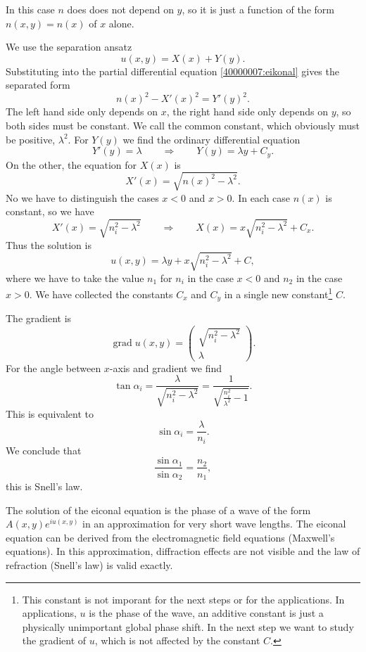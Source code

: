 \begin{loesung}
In this case $n$ does does not depend on $y$, so it is just a function
of the form $n(x,y)=n(x)$ of $x$ alone.
\begin{teilaufgaben}
\item
We use the separation ansatz
\[
u(x,y)=X(x) + Y(y).
\]
Substituting into the partial differential equation
\eqref{40000007:eikonal} gives the separated form
\[
n(x)^2-X'(x)^2=Y'(y)^2.
\]
The left hand side only depends on $x$, the right hand side only depends
on $y$, so both sides must be constant.
We call the common constant, which obviously must be positive, 
$\lambda^2$.
For 
$Y(y)$
we find the ordinary differential equation
\[
Y'(y)=\lambda \qquad\Rightarrow\qquad Y(y)=\lambda y+ C_y.
\]
On the other, the equation for $X(x)$ is
\[
X'(x)=\sqrt{n(x)^2-\lambda^2}.
\]
No we have to distinguish the cases $x<0$ and $x>0$.
In each case $n(x)$ is constant, so we have
\[
X'(x)=\sqrt{n_i^2-\lambda^2}
\qquad
\Rightarrow
\qquad
X(x)=x\sqrt{n_i^2-\lambda^2} + C_x.
\]
Thus the solution is
\[
u(x,y)=\lambda y + x\sqrt{n_i^2-\lambda^2} + C,
\]
where we have to take the value $n_1$ for $n_i$ in the case $x<0$
and $n_2$ in the case $x>0$.
We have collected the constants
$C_x$ and $C_y$ in a single new constant\footnote{This constant
is not imporant for the next steps or for the applications.
In applications, $u$ is the phase of the wave, an additive constant
is just a physically unimportant global phase shift.
In the next step we want to study the gradient of $u$, which is not
affected by the constant $C$.}
$C$.
\item
The gradient is
\[
\operatorname{grad}u(x,y)
=
\begin{pmatrix}
\sqrt{n_i^2-\lambda^2}\\
\lambda
\end{pmatrix}.
\]
For the angle between $x$-axis and gradient we find
\[
\tan\alpha_i
=
\frac{\lambda}{\sqrt{n_i^2-\lambda^2}}
=
\frac1{\sqrt{\frac{n_i^2}{\lambda^2}-1}}.
\]
This is equivalent to
\[
\sin\alpha_i=\frac{\lambda}{n_i}.
\]
We conclude that
\[
\frac{ \sin\alpha_1}{\sin\alpha_2}=\frac{n_2}{n_1},
\]
this is Snell's law.
\qedhere
\end{teilaufgaben}
\end{loesung}

\begin{diskussion}
The solution of the eiconal equation is the phase of a wave of the
form
$A(x,y)e^{iu(x,y)}$ in an approximation for very short wave lengths.
The eiconal equation can be derived from the electromagnetic field
equations (Maxwell's equations).
In this approximation, diffraction effects are not visible and the
law of refraction (Snell's law) is valid exactly.
\end{diskussion}
